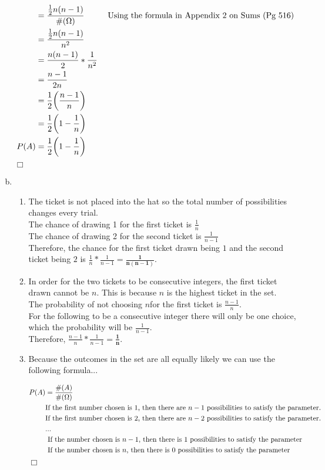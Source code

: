 \documentclass[10pt]{report}
\newenvironment{proof}{\par\noindent{\it Proof.}\hspace*{1em}}{$\Box$\bigskip}
\begin{document}
\begin{enumerate}[(a)]
\begin{proof}
\begin{align*}
    & = \frac{\frac{1}{2}n(n-1)}{\#(\Omega)}   \hspace{1cm} \textnormal{Using the formula in Appendix 2 on Sums (Pg 516)}\\
    &=  \frac{\frac{1}{2}n(n-1)}{n^2} \\
    &= \frac{n(n-1)}{2} * \frac{1}{n^2} \\
    &= \frac{n-1}{2n} \\
    &= \frac{1}{2} \bigg (\frac{n-1}{n}\bigg )\\
    &= \frac{1}{2} \bigg (1 - \frac{1}{n} \bigg ) \\
      P(A) &= \frac{1}{2} \bigg (1 - \frac{1}{n} \bigg ) 
    \end{align*}
    \end{proof}
    \item \begin{enumerate}
   	\item The ticket is not placed into the hat so the total number of possibilities changes every trial. \ \\
   	The chance of drawing 1 for the first ticket is $\frac{1}{n} $ \ \\
   	The chance of drawing 2 for the second ticket is $\frac{1}{n-1} $\ \\ Therefore, the chance for the first ticket drawn being $1 $ and the second ticket being $ 2$ is $\frac{1}{n} * \frac{1}{n-1} = \mathbf{\frac{1}{n(n -1)}} $. 
   	\item In order for the two tickets to be consecutive integers, the first ticket drawn cannot be $n$. This is because $n $ is the highest ticket in the set. \ \\ The probability of not choosing $n $for the first ticket is $\frac{n-1}{n}$. \ \\For the following to be a consecutive integer there will only be one choice, which the probability will be $\frac{1}{n-1} $. \ \\Therefore, $\frac{n-1}{n} * \frac{1}{n-1} = \mathbf{\frac{1}{n}} $.
   	\item 
   	Because the outcomes in the set are all equally likely we can use the following formula...
   	\begin{proof}
    \begin{align*}
    P(A) &= \frac{\#(A)}{\#(\Omega)} \\
    & \textnormal{If the first number chosen is } 1 \textnormal{, then there are }  n-1 \textnormal{ possibilities to satisfy the parameter. }\\ & \textnormal{If the first number chosen is } 2 \textnormal{, then there are }n-2 \textnormal{ possibilities to satisfy the parameter. } \\ & \textnormal{...} \\ & \textnormal{ If the number chosen is } n-1 \textnormal{, then there is } 1 \textnormal{ possibilities to satisfy the parameter} \\ & \textnormal{ If the number chosen is } n \textnormal{, then there is } 0 \textnormal{ possibilities to satisfy the parameter} \\

\end{align*}
\end{proof}
\end{enumerate}
\end{enumerate}
\end{document}
